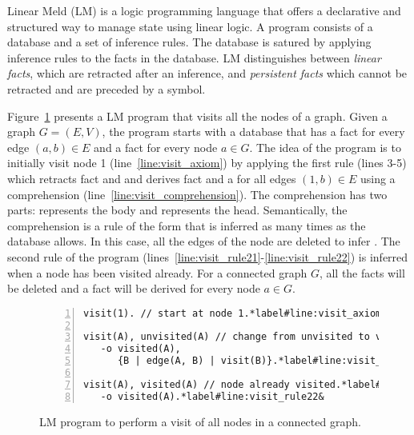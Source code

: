 Linear Meld (LM) is a logic programming language that offers a declarative and
structured way to manage state using linear logic. A program consists of a
database and a set of inference rules. The database is satured by applying
inference rules to the facts in the database. LM distinguishes between
\emph{linear facts}, which are retracted after an inference, and
\emph{persistent facts} which cannot be retracted and are preceded by a
\code{\bang} symbol.

Figure~\ref{code:visit} presents a LM program that visits all the nodes of a
graph. Given a graph $G = (E, V)$, the program starts with a database that has a
fact  for every edge $(a, b) \in E$ and a fact
 for every node $a \in G$. The idea of the program is to
initially visit node 1 (line~\ref{line:visit_axiom}) by applying the first rule
(lines 3-5) which retracts fact  and  and
derives fact  and a  for all edges $(1, b) \in
E$ using a comprehension (line~\ref{line:visit_comprehension}). The
comprehension has two parts:  represents the body and
 represents the head. Semantically, the comprehension is a rule
of the form  that is inferred as many times
as the database allows. In this case, all the edges of the node are deleted to
infer . The second rule of the program
(lines~\ref{line:visit_rule21}-\ref{line:visit_rule22}) is inferred when a node
has been visited already. For a connected graph $G$, all the 
facts will be deleted and a fact  will be derived for every
node $a \in G$.

\begin{figure}[h]
   \vspace{-3mm}
\begin{Verbatim}[numbers=left,commandchars=\*\#\&,fontsize=\stuffsize,xleftmargin=\stuffleftmargin]
visit(1). // start at node 1.*label#line:visit_axiom&

visit(A), unvisited(A) // change from unvisited to visited.
   -o visited(A),
      {B | edge(A, B) | visit(B)}.*label#line:visit_comprehension&
 
visit(A), visited(A) // node already visited.*label#line:visit_rule21&
   -o visited(A).*label#line:visit_rule22&
\end{Verbatim}
\caption{LM program to perform a visit of all nodes in a connected graph.}
  \label{code:visit}
\vspace{-5mm}
\end{figure}

